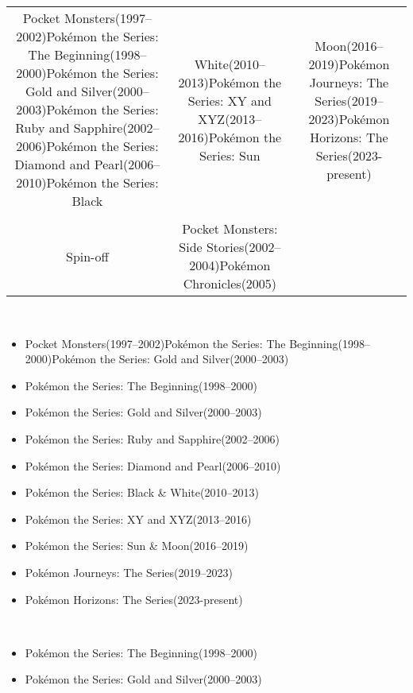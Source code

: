 \documentclass[a4paper,12pt]{article}
\begin{document}
\begin{tabular}{|c|c|c|} \hline
Pocket Monsters(1997–2002)Pokémon the Series: The Beginning(1998–2000)Pokémon the Series: Gold and Silver(2000–2003)Pokémon the Series: Ruby and Sapphire(2002–2006)Pokémon the Series: Diamond and Pearl(2006–2010)Pokémon the Series: Black & White(2010–2013)Pokémon the Series: XY and XYZ(2013–2016)Pokémon the Series: Sun & Moon(2016–2019)Pokémon Journeys: The Series(2019–2023)Pokémon Horizons: The Series(2023-present) \\
 \\
Spin-off & Pocket Monsters: Side Stories(2002–2004)Pokémon Chronicles(2005) \\
\end{tabular}\\ \par \vspace{0.5cm}

\begin{itemize}
\item Pocket Monsters(1997–2002)Pokémon the Series: The Beginning(1998–2000)Pokémon the Series: Gold and Silver(2000–2003)
\item Pokémon the Series: The Beginning(1998–2000)
\item Pokémon the Series: Gold and Silver(2000–2003)
\item Pokémon the Series: Ruby and Sapphire(2002–2006)
\item Pokémon the Series: Diamond and Pearl(2006–2010)
\item Pokémon the Series: Black & White(2010–2013)
\item Pokémon the Series: XY and XYZ(2013–2016)
\item Pokémon the Series: Sun & Moon(2016–2019)
\item Pokémon Journeys: The Series(2019–2023)
\item Pokémon Horizons: The Series(2023-present)
\end{itemize}\\ \par \vspace{0.5cm}

\begin{itemize}
\item Pokémon the Series: The Beginning(1998–2000)
\item Pokémon the Series: Gold and Silver(2000–2003)
\end{itemize}\\ \par \vspace{0.5cm}
\end{document}
